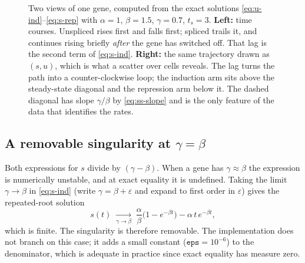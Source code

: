 \documentclass[11pt,a4paper]{article}
\newcommand{\uns}{u}
\newcommand{\spl}{s}
\newcommand{\ts}{t_{s}}
\theoremstyle{definition}
\begin{document}
\begin{figure}[htbp]
\caption{Two views of one gene, computed from the exact solutions
\eqref{eq:u-ind}--\eqref{eq:s-rep} with $\alpha = 1$, $\beta = 1.5$,
$\gamma = 0.7$, $\ts = 3$.
\textbf{Left:} time courses. Unspliced rises first and falls first; spliced
trails it, and continues rising briefly \emph{after} the gene has switched off.
That lag is the second term of \eqref{eq:s-ind}.
\textbf{Right:} the same trajectory drawn as $(\spl, \uns)$, which is what a
scatter over cells reveals. The lag turns the path into a counter-clockwise
loop; the induction arm sits above the steady-state diagonal and the repression
arm below it. The dashed diagonal has slope $\gamma/\beta$ by
\eqref{eq:ss-slope} and is the only feature of the data that identifies the
rates.}
\label{fig:dynamics}
\end{figure}

\subsection{A removable singularity at \texorpdfstring{$\gamma = \beta$}{gamma = beta}}

Both expressions for $\spl$ divide by $(\gamma - \beta)$. When a gene has
$\gamma \approx \beta$ the expression is numerically unstable, and at exact
equality it is undefined. Taking the limit $\gamma \to \beta$ in
\eqref{eq:s-ind} (write $\gamma = \beta + \varepsilon$ and expand to first
order in $\varepsilon$) gives the repeated-root solution
%
\begin{equation}
\spl(t) \;\xrightarrow[\gamma \to \beta]{}\;
\frac{\alpha}{\beta}\Big(1 - e^{-\beta t}\Big) - \alpha\, t\, e^{-\beta t},
\end{equation}
%
which is finite. The singularity is therefore removable. The implementation
does not branch on this case; it adds a small constant
($\texttt{eps} = 10^{-6}$) to the denominator, which is adequate in practice
since exact equality has measure zero.
\end{document}

